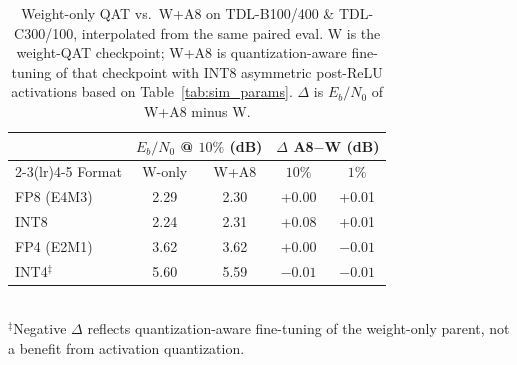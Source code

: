 \begin{table}[t]
    \centering
    \caption{Weight-only QAT vs.\ W+A8 on TDL-B100/400 \& TDL-C300/100, interpolated from
    the same paired eval. W is the weight-QAT checkpoint; W+A8 is
    quantization-aware fine-tuning of that checkpoint with INT8 asymmetric
    post-\gls{ReLU} activations based on Table~\ref{tab:sim_params}.
    $\Delta$ is $E_b/N_0$ of W+A8 minus W.}
    \label{tab:wo_vs_a8}
    \begin{tabular}{lcccc}
    \toprule
     & \multicolumn{2}{c}{$E_b/N_0$ @ $10\%$ (dB)} & \multicolumn{2}{c}{$\Delta$ A8$-$W (dB)} \\
    \cmidrule(lr){2-3}\cmidrule(lr){4-5}
    Format & W-only & W+A8 & $10\%$ & $1\%$ \\
    \midrule
    FP8 (E4M3) & 2.29 & 2.30 & +0.00 & +0.01 \\
    INT8 & 2.24 & 2.31 & +0.08 & +0.01 \\
    FP4 (E2M1) & 3.62 & 3.62 & +0.00 & $-0.01$ \\
    INT4$^{\ddagger}$ & 5.60 & 5.59 & $-0.01$ & $-0.01$ \\
    \bottomrule
    \end{tabular}\\[2pt]
    \footnotesize{$^{\ddagger}$Negative $\Delta$ reflects quantization-aware fine-tuning of the weight-only parent, not a benefit from activation quantization.}
    \end{table}
    